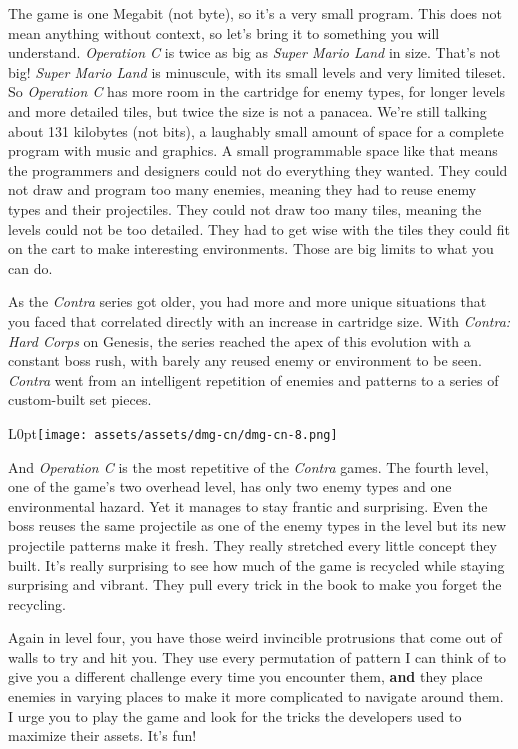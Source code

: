 \documentclass{book}
\begin{document}
The game is one Megabit (not byte), so it’s a very small program. This does not mean anything without context, so let’s bring it to something you will understand. \emph{Operation C} is twice as big as \emph{Super Mario Land} in size. That’s not big! \emph{Super Mario Land} is minuscule, with its small levels and very limited tileset. So \emph{Operation C} has more room in the cartridge for enemy types, for longer levels and more detailed tiles, but twice the size is not a panacea. We’re still talking about 131 kilobytes (not bits), a laughably small amount of space for a complete program with music and graphics. A small programmable space like that means the programmers and designers could not do everything they wanted. They could not draw and program too many enemies, meaning they had to reuse enemy types and their projectiles. They could not draw too many tiles, meaning the levels could not be too detailed. They had to get wise with the tiles they could fit on the cart to make interesting environments. Those are big limits to what you can do.\par
As the \emph{Contra} series got older, you had more and more unique situations that you faced that correlated directly with an increase in cartridge size. With \emph{Contra: Hard Corps} on Genesis, the series reached the apex of this evolution with a constant boss rush, with barely any reused enemy or environment to be seen. \emph{Contra} went from an intelligent repetition of enemies and patterns to a series of custom-built set pieces.\par
\begin{wrapfigure}{L}{0pt}{\texttt{[image: assets/assets/dmg-cn/dmg-cn-8.png]}}\end{wrapfigure}\noindent
And \emph{Operation C} is the most repetitive of the \emph{Contra} games. The fourth level, one of the game’s two overhead level, has only two enemy types and one environmental hazard. Yet it manages to stay frantic and surprising. Even the boss reuses the same projectile as one of the enemy types in the level but its new projectile patterns make it fresh. They really stretched every little concept they built. It’s really surprising to see how much of the game is recycled while staying surprising and vibrant. They pull every trick in the book to make you forget the recycling.\par
Again in level four, you have those weird invincible protrusions that come out of walls to try and hit you. They use every permutation of pattern I can think of to give you a different challenge every time you encounter them, \textbf{and} they place enemies in varying places to make it more complicated to navigate around them. I urge you to play the game and look for the tricks the developers used to maximize their assets. It’s fun!\par
\end{document}
